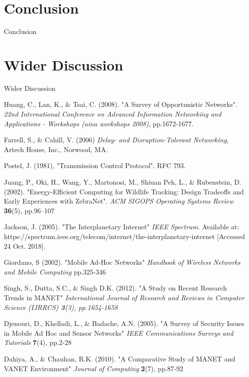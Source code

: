 \documentclass{article}
\begin{document}
\section{Conclusion}
Conclusion

\section{Wider Discussion}
Wider Discussion

\begin{thebibliography}{20}

Huang, C., Lan, K., \& Tsai, C. (2008). 
"A Survey of Opportunistic Networks". 
\textit{22nd International Conference on Advanced Information Networking and Applications - Workshops (aina workshops 2008)}, pp.1672-1677.

Farrell, S., \& Cahill, V. (2006) \textit{Delay- and Disruption-Tolerant Networking}, Artech House, Inc., Norwood, MA.

Postel, J. (1981), "Transmission Control Protocol". RFC 793.

Juang, P., Oki, H., Wang, Y., Martonosi, M., Shiuan Peh, L., \& Rubenstein, D. (2002).
"Energy-Efficient Computing for Wildlife Tracking: Design Tradeoffs and Early Experiences with ZebraNet".
\textit{ACM SIGOPS Operating Systems Review} \textbf{36}(5), pp.96–107

Jackson, J. (2005). 
"The Interplanetary Internet"
\textit{IEEE Spectrum}. Available at: https://spectrum.ieee.org/telecom/internet/the-interplanetary-internet [Accessed 24 Oct. 2018].

Giordano, S (2002).
"Mobile Ad-Hoc Networks"
\textit{Handbook of Wireless Networks and Mobile Computing} pp.325-346

Singh, S., Dutta, S.C., \& Singh D.K. (2012). 
"A Study on Recent Research Trends in MANET"
\textit{International Journal of Research and Reviews in Computer Science (IJRRCS) \textbf{3}(3), pp.1654-1658} 

Djenouri, D., Khelladi, L., \& Badache, A.N. (2005).
"A Survey of Security Issues in Mobile Ad Hoc and Sensor Networks"
\textit{IEEE Communications Surveys and Tutorials} \textbf{7}(4), pp.2-28

Dahiya, A., \& Chauhan, R.K. (2010).
"A Comparative Study of MANET and VANET Environment"
\textit{Journal of Computing} \textbf{2}(7), pp.87-92


\end{thebibliography}
\end{document}
